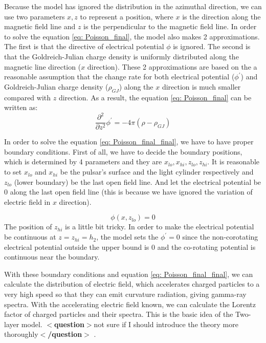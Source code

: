 \documentclass[12pt]{report}
\newcommand{\gj}[0]{
  Goldreich-Julian charge density
}
\newcommand{\question}[1]{
  $<$\textbf{question}$>$#1$<$\textbf{/question}$>$
}
\begin{document}
          Because the model has ignored the distribution in the azimuthal direction, we can use two parameters 
          $x, z$ to represent a position, where $x$ is the direction along the magnetic field line and $z$ is the 
          perpendicular to the magnetic field line. In order to solve the equation \ref{eq: Poisson_final}, 
          the model also makes 2 approximations. The first is that the directive of electrical potential $\phi$ 
          is ignored. The second is that the \gj{} is uniformly distributed along the magnetic line direction 
          ($x$ direction). These 2 approximations are based on the a reasonable assumption that the change rate 
          for both electrical potential ($\phi^{\prime}$) and \gj{}($\rho_{GJ}$) along the $x$ direction is much 
          smaller compared with $z$ direction. 
          As a result, the equation \ref{eq: Poisson_final} can be written as: 
          \begin{equation}
            \label{eq: Poisson_final_final}
            \frac{\partial^2}{\partial z^2} \phi^{\prime} = -4\pi\left(\rho - \rho_{GJ} \right)
          \end{equation}

          In order to solve the equation \ref{eq: Poisson_final_final}, we have to have proper boundary conditions. 
          First of all, we have to decide the boundary positions, which is determined by 4 parameters and they are  
          $x_{lo}, x_{hi}, z_{lo}, z_{hi}$. It is reasonable to set $x_{lo}$ and $x_{hi}$
          be the pulsar's surface and the light cylinder respectively and $z_{lo}$ (lower boundary) be the last open 
          field line. And let the electrical potential be $0$ along the last open field line (this is because we have 
          ignored the variation of electric field in $x$ direction).   

          \begin{equation}
            \label{eq: lower_boundary}
            \phi \left(x, z_{lo}\right) = 0
          \end{equation}
          The position of $z_{hi}$ is a little bit tricky. In order to make the electrical potential be 
          continuous at $z = z_{hi} = h_2$, the model sets the $\phi^{\prime} = 0$ since the 
          non-corotating electrical potential outside the upper bound is $0$ and the co-rotating potential
          is continuous near the boundary. 

          With these boundary conditions and equation \ref{eq: Poisson_final_final}, we can calculate the 
          distribution of electric field, which accelerates charged particles to a very high speed so that 
          they can emit curvature radiation, giving gamma-ray spectra. With the accelerating electric field 
          known, we can calculate the Lorentz factor of charged particles and their spectra. This is the 
          basic idea of the Two-layer model. \question{not sure if I should introduce the theory more 
          thoroughly}.
\end{document}
